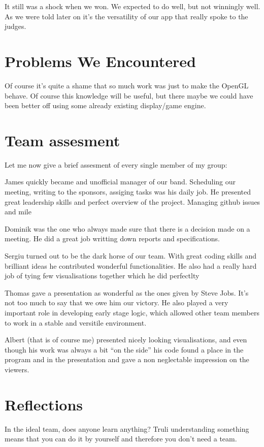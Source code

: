 \documentclass[12pt,a4paper]{article}
\begin{document}
                It still was a shock when we won. We expected to do well, but not winningly well. As we were told later on it's the versatility of our app that really spoke to the judges.

    
	\section*{Problems We Encountered}

        Of course it's quite a shame that so much work was just to make the OpenGL behave. Of course this knowledge will be useful, but there maybe we could have been better off using some already existing display/game engine.

	\section*{Team assesment}
		Let me now give a brief assesment of every single member of my group:
		
                James quickly became and unofficial manager of our band. Scheduling our meeting, writing to the sponsors, assiging tasks was his daily job. He presented great leadership skills and perfect overview of the project. Managing github issues and mile
		
		Dominik was the one who always made sure that there is a decision made on a meeting. He did a great job writting down reports and specifications.
		
		Sergiu turned out to be the dark horse of our team. With great coding skills and brilliant ideas he contributed wonderful functionalities. He also had a really hard job of tying few visualisations together which he did perfectlty
		
		Thomas gave a presentation as wonderful as the ones given by Steve Jobs. It's not too much to say that we owe him our victory. He also played a very important role in developing early stage logic, which allowed other team members to work in a stable and versitile environment.
		
		Albert (that is of course me) presented nicely looking visualisations, and even though his work was always a bit ``on the side'' his code found a place in the program and in the presentation and gave a non neglectable impression on the viewers.
	\section*{Reflections}
		In the ideal team, does anyone learn anything? Truli understanding something means that you can do it by yourself and therefore you don't need a team.
		
\end{document}
